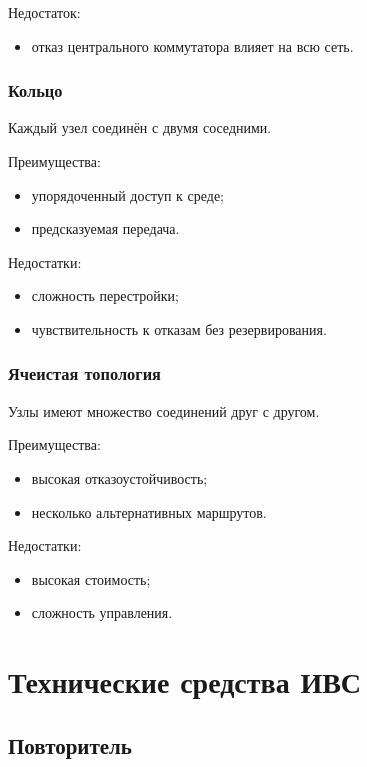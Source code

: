 \documentclass[12pt,a4paper]{article}
\begin{document}
Недостаток:
\begin{itemize}
    \item отказ центрального коммутатора влияет на всю сеть.
\end{itemize}

\subsubsection{Кольцо}

Каждый узел соединён с двумя соседними.

Преимущества:
\begin{itemize}
    \item упорядоченный доступ к среде;
    \item предсказуемая передача.
\end{itemize}

Недостатки:
\begin{itemize}
    \item сложность перестройки;
    \item чувствительность к отказам без резервирования.
\end{itemize}

\subsubsection{Ячеистая топология}

Узлы имеют множество соединений друг с другом.

Преимущества:
\begin{itemize}
    \item высокая отказоустойчивость;
    \item несколько альтернативных маршрутов.
\end{itemize}

Недостатки:
\begin{itemize}
    \item высокая стоимость;
    \item сложность управления.
\end{itemize}

\section{Технические средства ИВС}

\subsection{Повторитель}
\end{document}
